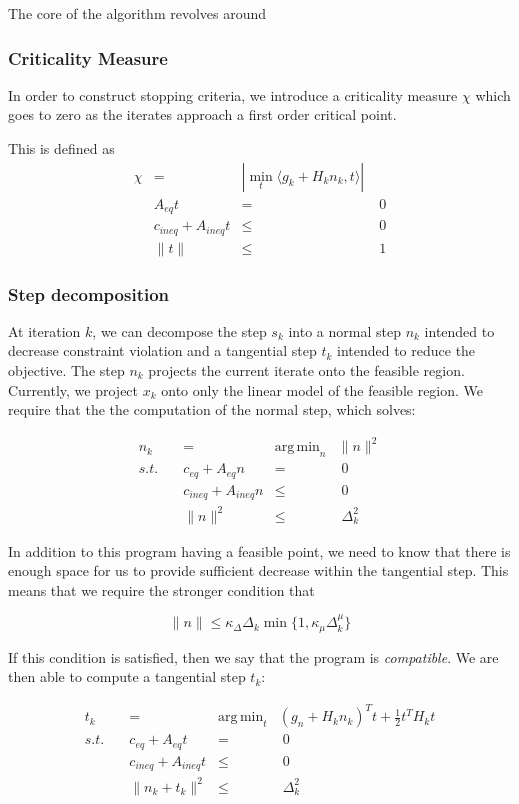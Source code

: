 \documentclass{article}
\DeclareMathOperator*{\argmin}{arg\,min}
\begin{document}
The core of the algorithm revolves around

\subsubsection{Criticality Measure}
In order to construct stopping criteria, we introduce a criticality measure $\chi$ which goes to zero as the iterates approach a first order critical point.

This is defined as
\begin{align*}
\chi & = & |\min_t \langle g_k + H_kn_k, t\rangle| \\
& A_{eq}t &=& \; 0 \\
& c_{ineq} + A_{ineq}t &\le& \; 0 \\
& \| t \| &\le& \; 1
\end{align*}



\subsubsection{Step decomposition}
At iteration $k$, we can decompose the step $s_k$ into a normal step $n_k$ intended to decrease constraint violation and a tangential step $t_k$ intended to reduce the objective.
The step $n_k$ projects the current iterate onto the feasible region.
Currently, we project $x_k$ onto only the linear model of the feasible region.
We require that the the computation of the normal step, which solves:

\begin{align*}
n_k &=& \argmin_n           & \|n\|^2 \\
s.t. \quad & c_{eq} + A_{eq}n     &=&\; 0 \\
     & c_{ineq} + A_{ineq}n &\le& \; 0  \\
     & \| n \|^2            &\le& \; \Delta_k^2
\end{align*}

In addition to this program having a feasible point, we need to know that there is enough space for us to provide sufficient decrease within the tangential step. This means that we require the stronger condition that

$$\|n\|\le \kappa_{\Delta} \Delta_k \min \{1, \kappa_{\mu}\Delta_k^{\mu}\}$$

If this condition is satisfied, then we say that the program is \emph{compatible}. We are then able to compute a tangential step $t_k$:

\begin{align*}
t_k &=& \argmin_t           & (g_n+H_kn_k)^Tt + \frac 1 2 t^T H_k t \\
s.t. \quad & c_{eq} + A_{eq}t	&=& \; 0 \\
     & c_{ineq} + A_{ineq}t	&\le& \; 0  \\
     & \| n_k + t_k \|^2 		&\le& \; \Delta_k ^2
\end{align*}
\end{document}
